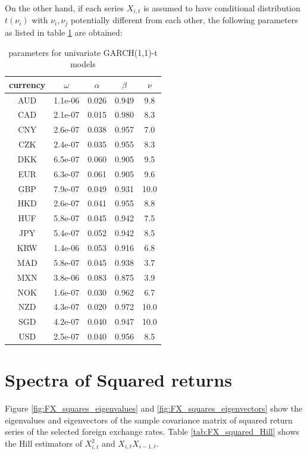 \documentclass{article}
\begin{document}
On the other hand, if each series $X_{i,t}$ is assumed to have
conditional distribution $t(\nu_i)$ with $\nu_i, \nu_j$ potentially
different from each other, the following parameters as listed in table
\ref{tab:ARCH_t_params} are obtained:
\begin{table}[htb!]
  \centering
  \begin{tabular}{c|cccc}
    currency & $\omega$ & $\alpha$ & $\beta$ & $\nu$ \\
    \hline
    AUD & 1.1e-06 & 0.026 & 0.949 & 9.8 \\
    CAD & 2.1e-07 & 0.015 & 0.980 & 8.3 \\
    CNY & 2.6e-07 & 0.038 & 0.957 & 7.0 \\
    CZK & 2.4e-07 & 0.035 & 0.955 & 8.3 \\
    DKK & 6.5e-07 & 0.060 & 0.905 & 9.5 \\
    EUR & 6.3e-07 & 0.061 & 0.905 & 9.6 \\
    GBP & 7.9e-07 & 0.049 & 0.931 & 10.0 \\
    HKD & 2.6e-07 & 0.041 & 0.955 & 8.8 \\
    HUF & 5.8e-07 & 0.045 & 0.942 & 7.5 \\
    JPY & 5.4e-07 & 0.052 & 0.942 & 8.5 \\
    KRW & 1.4e-06 & 0.053 & 0.916 & 6.8 \\
    MAD & 5.8e-07 & 0.045 & 0.938 & 3.7 \\
    MXN & 3.8e-06 & 0.083 & 0.875 & 3.9 \\
    NOK & 1.6e-07 & 0.030 & 0.962 & 6.7 \\
    NZD & 4.3e-07 & 0.020 & 0.972 & 10.0 \\
    SGD & 4.2e-07 & 0.040 & 0.947 & 10.0 \\
    USD & 2.5e-07 & 0.040 & 0.956 & 8.5
  \end{tabular}
  \label{tab:ARCH_t_params}
  \caption{parameters for univariate GARCH(1,1)-t models}
\end{table}

\section{Spectra of Squared returns}
Figure \ref{fig:FX_squares_eigenvalues} and
\ref{fig:FX_squares_eigenvectors} show the eigenvalues and
eigenvectors of the sample covariance matrix of squared return series
of the selected foreign exchange rates. Table
\ref{tab:FX_squared_Hill} shows the Hill estimators of $X_{i,t}^2$ and
$X_{i,t} X_{i-1,t}$.
\end{document}
